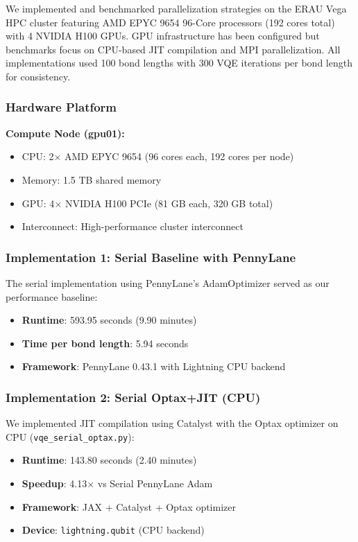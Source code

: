 \documentclass[11pt]{article}
\begin{document}
We implemented and benchmarked parallelization strategies on the ERAU Vega HPC cluster featuring AMD EPYC 9654 96-Core processors (192 cores total) with 4 NVIDIA H100 GPUs. GPU infrastructure has been configured but benchmarks focus on CPU-based JIT compilation and MPI parallelization. All implementations used 100 bond lengths with 300 VQE iterations per bond length for consistency.

\subsubsection{Hardware Platform}

\textbf{Compute Node (gpu01):}
\begin{itemize}
    \item CPU: 2$\times$ AMD EPYC 9654 (96 cores each, 192 cores per node)
    \item Memory: 1.5 TB shared memory
    \item GPU: 4$\times$ NVIDIA H100 PCIe (81 GB each, 320 GB total)
    \item Interconnect: High-performance cluster interconnect
\end{itemize}

\subsubsection{Implementation 1: Serial Baseline with PennyLane}

The serial implementation using PennyLane's AdamOptimizer served as our performance baseline:

\begin{itemize}
    \item \textbf{Runtime}: 593.95 seconds (9.90 minutes)
    \item \textbf{Time per bond length}: 5.94 seconds
    \item \textbf{Framework}: PennyLane 0.43.1 with Lightning CPU backend
\end{itemize}

\subsubsection{Implementation 2: Serial Optax+JIT (CPU)}

We implemented JIT compilation using Catalyst with the Optax optimizer on CPU (\texttt{vqe\_serial\_optax.py}):

\begin{itemize}
    \item \textbf{Runtime}: 143.80 seconds (2.40 minutes)
    \item \textbf{Speedup}: 4.13× vs Serial PennyLane Adam
    \item \textbf{Framework}: JAX + Catalyst + Optax optimizer
    \item \textbf{Device}: \texttt{lightning.qubit} (CPU backend)
\end{itemize}
\end{document}
